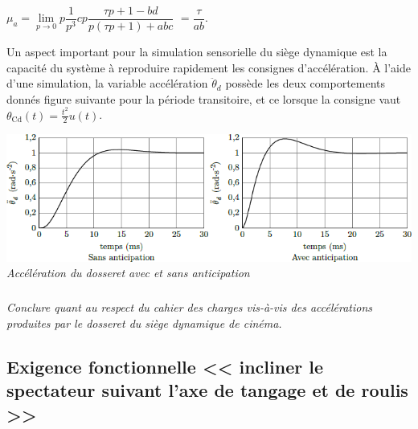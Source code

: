 \documentclass[10pt,fleqn]{article} %
\begin{document}
\begin{multicols}{2}
\begin{corrige}
$\mu_a=\lim\limits_{p\to0}  p\dfrac{1}{p^3}  cp \dfrac{\tau p + 1 -bd}{p\left(\tau p + 1 \right)+abc}$ 
$ =   \dfrac{\tau}{ab}$.

\end{corrige}
\else
\fi

Un aspect important pour la simulation sensorielle du siège dynamique
est la capacité du système à reproduire rapidement les consignes
d'accélération. À l'aide d'une simulation, la variable accélération
\({\ddot{\theta}}_{d}\) possède les deux comportements donnés figure suivante
pour la période transitoire, et ce lorsque la consigne vaut
\(\theta_{\text{Cd}}\left( t \right) = \frac{t^{2}}{2}u(t)\).


\begin{center}
\includegraphics[width=1.0\linewidth]{images/image18.png}
\textit{Accélération du dosseret avec et sans anticipation \label{fig17}}
\end{center}

\subparagraph{}\textit{Conclure quant au respect du cahier des charges vis-à-vis des
  accélérations produites par le dosseret du siège dynamique de cinéma.}
\ifprof
\begin{corrige}
\end{corrige}
\else
\fi


\subsection*{Exigence fonctionnelle << incliner le spectateur suivant l'axe de tangage et de roulis >>}
%



\end{multicols}
\end{document}
